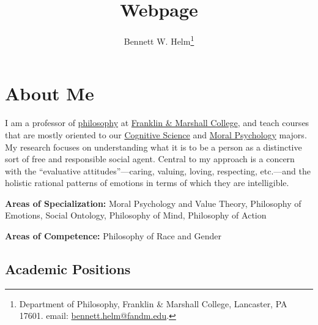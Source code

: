 \documentclass[%
  11pt,%
]{article}
\begin{document}

\ifx\HCode\undefined
  \title{Webpage}
  \author{Bennett W. Helm\footnote{Department of Philosophy, Franklin \& Marshall College, Lancaster, PA 17601. email: \href{mailto:bennett.helm@fandm.edu}{bennett.helm@fandm.edu}.}}
  \date{}
  \maketitle
\fi

\tableofcontents

\ifdefined\HCode

    \begin{center}
    \end{center}
\fi

\section*{About Me}

I am a professor of \href{https://www.fandm.edu/fields-of-study/philosophy/index.html}{philosophy} at \href{https://www.fandm.edu}{Franklin \& Marshall College}, and teach courses that are mostly oriented to our \href{https://www.fandm.edu/fields-of-study/cognitive-science/index.html}{Cognitive Science} and \href{https://www.fandm.edu/fields-of-study/moral-psychology/index.html}{Moral Psychology} majors. My research focuses on understanding what it is to be a person as a distinctive sort of free and responsible social agent. Central to my approach is a concern with the \enquote{evaluative attitudes}---caring, valuing, loving, respecting, etc.---and the holistic rational patterns of emotions in terms of which they are intelligible.

\noindent\textbf{Areas of Specialization:}
Moral Psychology and Value Theory,
Philosophy of Emotions,
Social Ontology,
Philosophy of Mind,
Philosophy of Action

\noindent\textbf{Areas of Competence:}
Philosophy of Race and Gender

\subsection*{Academic Positions}
\end{document}
